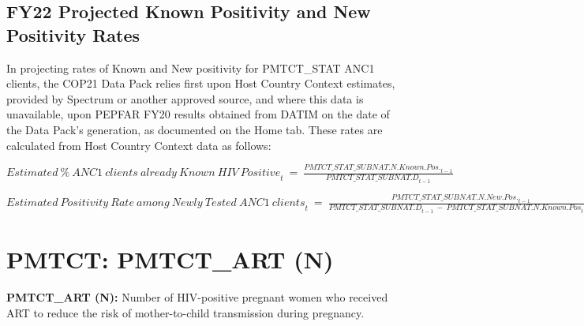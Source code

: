 \documentclass[
  openany]{book}
\begin{document}
\hypertarget{fy22-projected-known-positivity-and-new-positivity-rates}{%
\subsection{FY22 Projected Known Positivity and New Positivity Rates}\label{fy22-projected-known-positivity-and-new-positivity-rates}}

In projecting rates of Known and New positivity for PMTCT\_STAT ANC1
clients, the COP21 Data Pack relies first upon Host Country Context
estimates, provided by Spectrum or another approved source, and where
this data is unavailable, upon PEPFAR FY20 results obtained from DATIM
on the date of the Data Pack's generation, as documented on the Home
tab. These rates are calculated from Host Country Context data as
follows:

\begin{center} ${Estimated\ \%\ ANC1\ clients\ already\ Known\ HIV\ Positive}_{t}\  = \ \frac{{PMTCT\_ STAT\_ SUBNAT.N.Known.Pos.}_{t - 1}}{{PMTCT\_ STAT\_ SUBNAT.D}_{t - 1}}$ \end{center}

\begin{center} ${Estimated\ Positivity\ Rate\ among\ Newly\ Tested\ ANC1\ clients}_{t}\  = \ \frac{{PMTCT\_ STAT\_ SUBNAT.N.New.Pos.}_{t - 1}}{{PMTCT\_ STAT\_ SUBNAT.D}_{t - 1}\  - \ {PMTCT\_ STAT\_ SUBNAT.N.Known.Pos}_{t - 1}}$ \end{center}

\textbf{\hfill\break
}

\hypertarget{pmtct-pmtct_art-n}{%
\section{PMTCT: PMTCT\_ART (N)}\label{pmtct-pmtct_art-n}}

\textbf{PMTCT\_ART (N):} Number of HIV-positive pregnant women who received
ART to reduce the risk of mother-to-child transmission during pregnancy.
\end{document}
